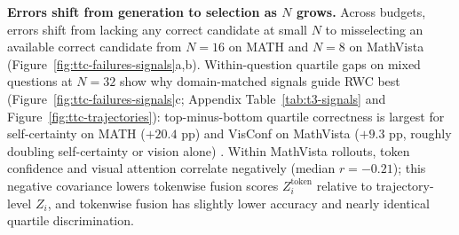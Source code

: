 \documentclass{article}
\begin{document}
\textbf{Errors shift from generation to selection as $N$ grows.} Across budgets, errors shift from lacking any correct candidate at small $N$ to misselecting an available correct candidate from $N=16$ on MATH and $N=8$ on MathVista (Figure~\ref{fig:ttc-failures-signals}a,b). Within-question quartile gaps on mixed questions at $N=32$ show why domain-matched signals guide RWC best (Figure~\ref{fig:ttc-failures-signals}c; Appendix Table~\ref{tab:t3-signals} and Figure~\ref{fig:ttc-trajectories}): top-minus-bottom quartile correctness is largest for self-certainty on MATH ($+20.4$ pp) \citep{kang2025selfcertainty} and VisConf on MathVista ($+9.3$ pp, roughly doubling self-certainty or vision alone) \citep{usman2026visconf}. Within MathVista rollouts, token confidence and visual attention correlate negatively (median $r = -0.21$); this negative covariance lowers tokenwise fusion scores $Z_i^{\text{token}}$ relative to trajectory-level $Z_i$, and tokenwise fusion has slightly lower accuracy and nearly identical quartile discrimination.


\end{document}
